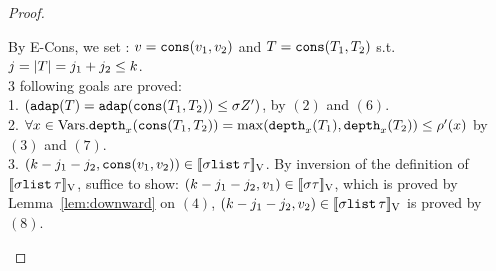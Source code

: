 \documentclass[a4paper,11pt]{article}
\theoremstyle{definition}
\begin{document}
\begin{proof}
\begin{mainitem}
\[{}
\]
%
By E-Cons, we set : $v = \mathop{\mathtt{cons}}(v_1, v_2)$ and $T =
\mathop{\mathtt{cons}}(T_1, T_2)$ s.t. $j = |T|= j_1 + j_2 \leq k$.\\
3 following goals are proved:\\ 
%
1. $(\mathtt{adap}(T) = \mathtt{adap}(\mathop{\mathtt{cons}}(T_1, T_2)) \leq
\sigma Z')$, by $(2)$ and $(6)$.\\
2. $\forall x \in \mbox{Vars}. \mathtt{depth}_{x}(\mathop{\mathtt{cons}}(T_1, T_2))
= \max ( \mathtt{depth}_{x}(T_1), \mathtt{depth}_{x}(T_2) ) \leq
\rho'(x)$ by $(3)$ and $(7)$. \\
3. $(k - j_1 -j_2, \mathop{\mathtt{cons}}(v_1,v_2)  )  \in [\![  \sigma \mathtt{list} \, \tau  ]\!]_{\text{V}}$.
%
By inversion of the definition of $[\![ \sigma \mathtt{list} \, \tau ]\!]_{\text{V}}$,
%
suffice to show:
%
$(k-j_1-j_2, v_1) \in [\![ \sigma \tau ]\!]_{\text{V}}$,
%
which is proved by Lemma~\ref{lem:downward} on $(4)$,
%
$(k-j_1-j_2, v_2) \in [\![  \sigma \mathtt{list} \, \tau ]\!]_{\text{V}}$ 
%
is proved by $(8)$.\\



\end{mainitem}
\end{proof}
\end{document}
